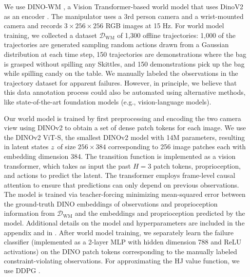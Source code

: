  We use DINO-WM \cite{zhou2024dinowm}, a Vision Transformer-based world model that uses DinoV2 as an encoder \cite{oquab2023dinov2}. 
The manipulator uses a 3rd person camera and a wrist-mounted camera and records $3 \times 256 \times 256$ RGB images at 15 Hz.
For world model training, we collected a dataset  $\mathcal{D}_\text{WM}$ of 1,300 offline trajectories: 1,000 of the trajectories are generated sampling random actions drawn from a Gaussian distribution at each time step, 150 trajectories are demonstrations where the bag is grasped without spilling any Skittles, and 150 demonstrations pick up the bag while spilling candy on the table. 
We manually labeled the observations in the trajectory dataset for apparent failures. %
However, in principle, we believe that this data annotation process could also be automated using alternative methods, like state-of-the-art foundation models (e.g., vision-language models). 

Our world model is trained by first preprocessing and encoding the two camera view using DINOv2 to obtain a set of dense patch tokens for each image. 
We use the DINOv2 ViT-S, the smallest DINOv2 model with 14M parameters, resulting in latent states $z$ of size $256 \times 384$ corresponding to 256 image patches each with embedding dimension 384. 
The transition function is implemented as a vision transformer, which takes as input the past $H=3$ patch tokens, proprioception, and actions to predict the latent. The transformer employs frame-level causal attention to ensure that predictions can only depend on previous observations. 
The model is trained via teacher-forcing minimizing mean-squared error between the ground-truth DINO embeddings of observations and proprioception information from $\mathcal{D}_\text{WM}$ and the embeddings and proprioception predicted by the model. 
Additional details on the model and hyperparameters are included in the appendix and in \cite{zhou2024dinowm}. 
After world model training, we separately learn the failure classifier (implemented as a 2-layer MLP with hidden dimension 788 and ReLU activations) on the DINO patch tokens corresponding to the manually labeled constraint-violating observations. 
For approximating the HJ value function, we use DDPG \cite{lillicrap2019continuouscontroldeepreinforcement, li2025certifiabledeeplearningreachability}. 




